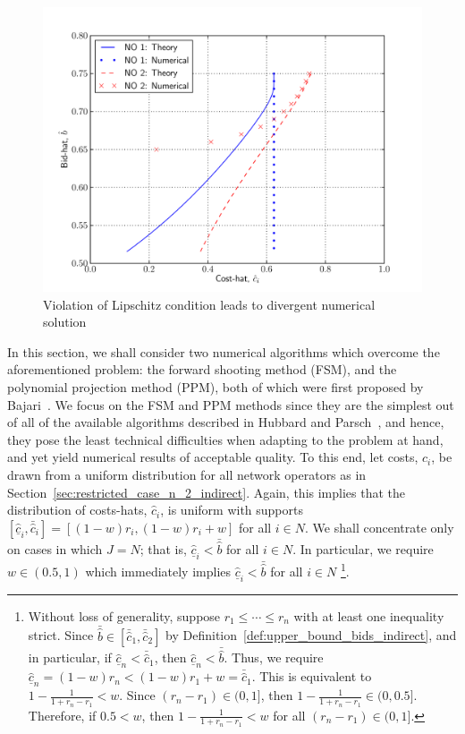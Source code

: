 \begin{figure}[t]
  \includegraphics[width=\figsize]{Indirect/Figures/lipschitz}
  \caption{Violation of Lipschitz condition leads to divergent numerical solution}
  \label{fig:lipschitz_indirect}
\end{figure}

In this section, we shall consider two numerical algorithms which overcome the aforementioned problem: the forward shooting method (FSM), and the polynomial projection method (PPM), both of which were first proposed by Bajari~\cite{Bajari2001a}. We focus on the FSM and PPM methods since they are the simplest out of all of the available algorithms described in Hubbard and Parsch~\cite{HubbardPaarsch2011}, and hence, they pose the least technical difficulties when adapting to the problem at hand, and yet yield numerical results of acceptable quality. To this end, let costs, $c_i$, be drawn from a uniform distribution for all network operators as in Section~\ref{sec:restricted_case_n_2_indirect}. Again, this implies that the distribution of costs-hats, $\hat{c}_i$, is uniform with supports $[\underline{\hat{c}}_i, \bar{\hat{c}}_i] = [(1-w)r_i, (1-w)r_i + w]$ for all $i\in N$. We shall concentrate only on cases in which $J=N$; that is, $\underline{\hat{c}}_i < \bar{\hat{b}}$ for all $i\in N$. In particular, we require $w\in\left(0.5, 1\right)$ which immediately implies $\underline{\hat{c}}_i < \bar{\hat{b}}$ for all $i\in N$ \footnote{Without loss of generality, suppose $r_1\leq\cdots\leq r_n$ with at least one inequality strict. Since $\bar{\hat{b}}\in[\bar{\hat{c}}_1, \bar{\hat{c}}_2]$ by Definition~\ref{def:upper_bound_bids_indirect}, and in particular, if $\underline{\hat{c}}_n < \bar{\hat{c}}_1$, then $\underline{\hat{c}}_n < \bar{\hat{b}}$. Thus, we require $\underline{\hat{c}}_n = (1-w)r_n < (1-w)r_1 + w = \bar{\hat{c}}_1$. This is equivalent to $1 - \frac{1}{1+r_n-r_1} < w$. Since $(r_n - r_1)\in (0, 1]$, then $1 - \frac{1}{1+r_n-r_1} \in (0,0.5]$. Therefore, if $0.5 < w$, then $1 - \frac{1}{1+r_n-r_1} < w$ for all $(r_n-r_1)\in (0,1]$.}.

